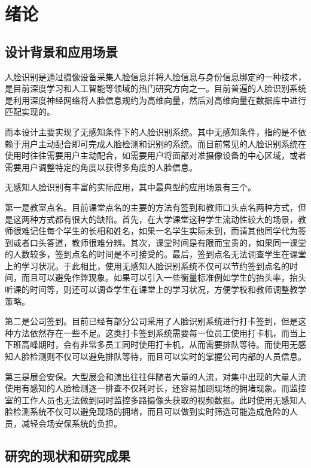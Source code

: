 \chapter{绪论}

\section{设计背景和应用场景}

人脸识别是通过摄像设备采集人脸信息并将人脸信息与身份信息绑定的一种技术，是目前深度学习和人工智能等领域的热门研究方向之一。目前普遍的人脸识别系统是利用深度神经网络将人脸信息规约为高维向量，然后对高维向量在数据库中进行匹配实现的。

而本设计主要实现了无感知条件下的人脸识别系统。其中无感知条件，指的是不依赖于用户主动配合即可完成人脸检测和识别的系统。而目前常见的人脸识别系统在使用时往往需要用户主动配合，如需要用户将面部对准摄像设备的中心区域，或者需要用户调整特定的角度以获得多角度的人脸信息。

无感知人脸识别有丰富的实际应用，其中最典型的应用场景有三个。

第一是教室点名。目前课堂点名的主要的方法有签到和教师口头点名两种方式，但是这两种方式都有很大的缺陷。首先，在大学课堂这种学生流动性较大的场景，教师很难记住每个学生的长相和姓名，如果一名学生实际未到，而请其他同学代为签到或者口头答道，教师很难分辨。其次，课堂时间是有限而宝贵的，如果同一课堂的人数较多，签到点名的时间是不可接受的。最后，签到点名无法调查学生在课堂上的学习状况。于此相比，使用无感知人脸识别系统不仅可以节约签到点名的时间，而且可以避免作弊现象。如果可以引入一些衡量标准例如学生的抬头率，抬头听课的时间等，则还可以调查学生在课堂上的学习状况，方便学校和教师调整教学策略。

第二是公司签到。目前已经有部分公司采用了人脸识别系统进行打卡签到，但是这种方法依然存在一些不足。这类打卡签到系统需要每一位员工使用打卡机，而当上下班高峰期时，会有非常多员工同时使用打卡机，从而需要排队等待。而使用无感知人脸检测则不仅可以避免排队等待，而且可以实时的掌握公司内部的人员信息。

第三是展会安保。大型展会和演出往往伴随者大量的人流，对集中出现的大量人流使用有感知的人脸检测逐一排查不仅耗时长，还容易加剧现场的拥堵现象。而监控室的工作人员也无法做到同时监控多路摄像头获取的视频数据。此时使用无感知人脸检测系统不仅可以避免现场的拥堵，而且可以做到实时筛选可能造成危险的人员，减轻会场安保系统的负担。

\section{研究的现状和研究成果}

